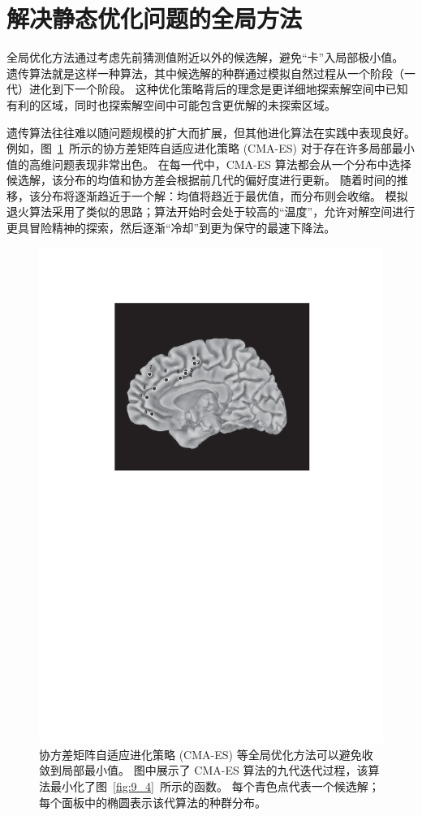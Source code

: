 \section{解决静态优化问题的全局方法}

全局优化方法通过考虑先前猜测值附近以外的候选解，避免“卡”入局部极小值。
遗传算法就是这样一种算法，其中候选解的种群通过模拟自然过程从一个阶段（一代）进化到下一个阶段。
这种优化策略背后的理念是更详细地探索解空间中已知有利的区域，同时也探索解空间中可能包含更优解的未探索区域。


遗传算法往往难以随问题规模的扩大而扩展，但其他进化算法在实践中表现良好。
例如，图~\ref{fig:9_7}~所示的协方差矩阵自适应进化策略 (CMA-ES) 对于存在许多局部最小值的高维问题表现非常出色。
在每一代中，CMA-ES 算法都会从一个分布中选择候选解，该分布的均值和协方差会根据前几代的偏好度进行更新。
随着时间的推移，该分布将逐渐趋近于一个解：均值将趋近于最优值，而分布则会收缩。
模拟退火算法采用了类似的思路；算法开始时会处于较高的“温度”，允许对解空间进行更具冒险精神的探索，然后逐渐“冷却”到更为保守的最速下降法。


\begin{figure}[!htb]
	\centering
	\includegraphics[width=1.0\linewidth]{chap9/9_7}
	\caption{协方差矩阵自适应进化策略 (CMA-ES) 等全局优化方法可以避免收敛到局部最小值。
		图中展示了 CMA-ES 算法的九代迭代过程，该算法最小化了图~\ref{fig:9_4}~所示的函数。
		每个青色点代表一个候选解；每个面板中的椭圆表示该代算法的种群分布。 \label{fig:9_7}}
\end{figure}


